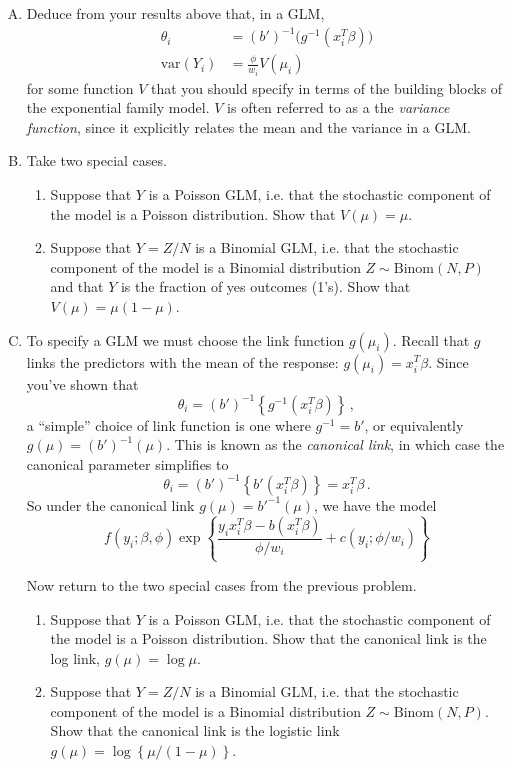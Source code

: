 \documentclass[11pt]{article}
\begin{document}
\begin{enumerate}[(A)]

\item Deduce from your results above that, in a GLM,
 $$
\begin{aligned}
\theta_i &= (b')^{-1} \Big( g^{-1}(x_i^T \beta) \Big) \\
\mbox{var} (Y_i ) &= \frac{\phi}{w_i} V(\mu_i)
\end{aligned}
$$
for some function $V$ that you should specify in terms of the building blocks of the exponential family model.  $V$ is often referred to as a the \emph{variance function}, since it explicitly relates the mean and the variance in a GLM.  

\item Take two special cases.  
\begin{enumerate}[(1)]
\item Suppose that $Y$ is a Poisson GLM, i.e. that the stochastic component of the model is a Poisson distribution.  Show that $V(\mu) = \mu$.
\item Suppose that $Y = Z/N$ is a Binomial GLM, i.e. that the stochastic component of the model is a Binomial distribution $Z \sim \mbox{Binom}(N, P)$ and that $Y$ is the fraction of yes outcomes (1's).  Show that $V(\mu) = \mu(1-\mu)$.  
\end{enumerate}

\item To specify a GLM we must choose the link function $g(\mu_i)$.  Recall that $g$ links the predictors with the mean of the response: $g(\mu_i) = x_i^T \beta$.  Since you've shown that
$$
\theta_i = (b')^{-1} \left\{g^{-1}(x_i^T \beta) \right\} \, ,
$$
a ``simple'' choice of link function is one where $g^{-1} = b'$, or equivalently $g(\mu) = (b')^{-1}(\mu)$.  This is known as the \textit{canonical link}, in which case the canonical parameter simplifies to
$$
\theta_i = (b')^{-1} \left\{b'(x_i^T \beta) \right\} = x_i^T \beta \, .
$$
So under the canonical link $g(\mu) = b'^{-1}(\mu)$, we have the model
$$
f(y_i; \beta, \phi) \exp \left\{ \frac{y_i x_i^T \beta - b(x_i^T \beta)}{\phi/w_i} + c(y_i; \phi/w_i)   \right \}
$$

Now return to the two special cases from the previous problem.
\begin{enumerate}[(1)]
\item Suppose that $Y$ is a Poisson GLM, i.e. that the stochastic component of the model is a Poisson distribution. Show that the canonical link is the log link, $g(\mu) = \log \mu$.  
\item Suppose that $Y = Z/N$ is a Binomial GLM, i.e. that the stochastic component of the model is a Binomial distribution $Z \sim \mbox{Binom}(N, P)$.   Show that the canonical link is the logistic link $g(\mu) = \log \left\{ \mu/(1-\mu) \right\}$.  
\end{enumerate}

\end{enumerate}
\end{document}
